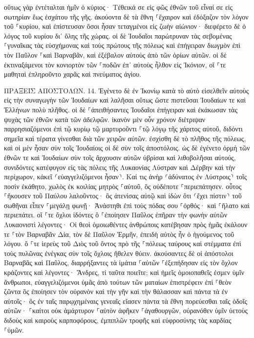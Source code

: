 \documentclass[twoside, 9pt]{extreport}
\begin{document}
οὕτως γὰρ ἐντέταλται ἡμῖν ὁ κύριος· Τέθεικά σε εἰς φῶς ἐθνῶν τοῦ εἶναί σε εἰς σωτηρίαν ἕως ἐσχάτου τῆς γῆς. 
ἀκούοντα δὲ τὰ ἔθνη ⸀ἔχαιρον καὶ ἐδόξαζον τὸν λόγον τοῦ ⸀κυρίου, καὶ ἐπίστευσαν ὅσοι ἦσαν τεταγμένοι εἰς ζωὴν αἰώνιον· 
διεφέρετο δὲ ὁ λόγος τοῦ κυρίου δι᾽ ὅλης τῆς χώρας. 
οἱ δὲ Ἰουδαῖοι παρώτρυναν τὰς σεβομένας ⸀γυναῖκας τὰς εὐσχήμονας καὶ τοὺς πρώτους τῆς πόλεως καὶ ἐπήγειραν διωγμὸν ἐπὶ τὸν Παῦλον ⸀καὶ Βαρναβᾶν, καὶ ἐξέβαλον αὐτοὺς ἀπὸ τῶν ὁρίων αὐτῶν. 
οἱ δὲ ἐκτιναξάμενοι τὸν κονιορτὸν τῶν ⸀ποδῶν ἐπ᾽ αὐτοὺς ἦλθον εἰς Ἰκόνιον, 
οἵ ⸀τε μαθηταὶ ἐπληροῦντο χαρᾶς καὶ πνεύματος ἁγίου. 

ΠΡΑΞΕΙΣ ΑΠΟΣΤΟΛΩΝ.
14.
Ἐγένετο δὲ ἐν Ἰκονίῳ κατὰ τὸ αὐτὸ εἰσελθεῖν αὐτοὺς εἰς τὴν συναγωγὴν τῶν Ἰουδαίων καὶ λαλῆσαι οὕτως ὥστε πιστεῦσαι Ἰουδαίων τε καὶ Ἑλλήνων πολὺ πλῆθος. 
οἱ δὲ ⸀ἀπειθήσαντες Ἰουδαῖοι ἐπήγειραν καὶ ἐκάκωσαν τὰς ψυχὰς τῶν ἐθνῶν κατὰ τῶν ἀδελφῶν. 
ἱκανὸν μὲν οὖν χρόνον διέτριψαν παρρησιαζόμενοι ἐπὶ τῷ κυρίῳ τῷ μαρτυροῦντι ⸀τῷ λόγῳ τῆς χάριτος αὐτοῦ, διδόντι σημεῖα καὶ τέρατα γίνεσθαι διὰ τῶν χειρῶν αὐτῶν. 
ἐσχίσθη δὲ τὸ πλῆθος τῆς πόλεως, καὶ οἱ μὲν ἦσαν σὺν τοῖς Ἰουδαίοις οἱ δὲ σὺν τοῖς ἀποστόλοις. 
ὡς δὲ ἐγένετο ὁρμὴ τῶν ἐθνῶν τε καὶ Ἰουδαίων σὺν τοῖς ἄρχουσιν αὐτῶν ὑβρίσαι καὶ λιθοβολῆσαι αὐτούς, 
συνιδόντες κατέφυγον εἰς τὰς πόλεις τῆς Λυκαονίας Λύστραν καὶ Δέρβην καὶ τὴν περίχωρον, 
κἀκεῖ ⸂εὐαγγελιζόμενοι ἦσαν⸃. 
Καί τις ἀνὴρ ⸂ἀδύνατος ἐν Λύστροις⸃ τοῖς ποσὶν ἐκάθητο, χωλὸς ἐκ κοιλίας μητρὸς ⸀αὐτοῦ, ὃς οὐδέποτε ⸀περιεπάτησεν. 
οὗτος ⸀ἤκουσεν τοῦ Παύλου λαλοῦντος· ὃς ἀτενίσας αὐτῷ καὶ ἰδὼν ὅτι ⸂ἔχει πίστιν⸃ τοῦ σωθῆναι 
εἶπεν ⸀μεγάλῃ φωνῇ· Ἀνάστηθι ἐπὶ τοὺς πόδας σου ⸀ὀρθός· καὶ ⸀ἥλατο καὶ περιεπάτει. 
οἵ ⸀τε ὄχλοι ἰδόντες ὃ ⸀ἐποίησεν Παῦλος ἐπῆραν τὴν φωνὴν αὐτῶν Λυκαονιστὶ λέγοντες· Οἱ θεοὶ ὁμοιωθέντες ἀνθρώποις κατέβησαν πρὸς ἡμᾶς 
ἐκάλουν τε ⸀τὸν Βαρναβᾶν Δία, τὸν δὲ Παῦλον Ἑρμῆν, ἐπειδὴ αὐτὸς ἦν ὁ ἡγούμενος τοῦ λόγου. 
ὅ ⸀τε ἱερεὺς τοῦ Διὸς τοῦ ὄντος πρὸ τῆς ⸀πόλεως ταύρους καὶ στέμματα ἐπὶ τοὺς πυλῶνας ἐνέγκας σὺν τοῖς ὄχλοις ἤθελεν θύειν. 
ἀκούσαντες δὲ οἱ ἀπόστολοι Βαρναβᾶς καὶ Παῦλος, διαρρήξαντες τὰ ἱμάτια ⸀αὐτῶν ⸀ἐξεπήδησαν εἰς τὸν ὄχλον κράζοντες 
καὶ λέγοντες· Ἄνδρες, τί ταῦτα ποιεῖτε; καὶ ἡμεῖς ὁμοιοπαθεῖς ἐσμεν ὑμῖν ἄνθρωποι, εὐαγγελιζόμενοι ὑμᾶς ἀπὸ τούτων τῶν ματαίων ἐπιστρέφειν ἐπὶ ⸀θεὸν ζῶντα ὃς ἐποίησεν τὸν οὐρανὸν καὶ τὴν γῆν καὶ τὴν θάλασσαν καὶ πάντα τὰ ἐν αὐτοῖς· 
ὃς ἐν ταῖς παρῳχημέναις γενεαῖς εἴασεν πάντα τὰ ἔθνη πορεύεσθαι ταῖς ὁδοῖς αὐτῶν· 
⸀καίτοι οὐκ ἀμάρτυρον ⸀αὑτὸν ἀφῆκεν ⸀ἀγαθουργῶν, οὐρανόθεν ὑμῖν ὑετοὺς διδοὺς καὶ καιροὺς καρποφόρους, ἐμπιπλῶν τροφῆς καὶ εὐφροσύνης τὰς καρδίας ⸀ὑμῶν. 
\end{document}
